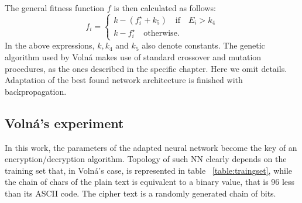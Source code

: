 \documentclass[%
    corpo=11pt,
    twoside,
    stile=classica,
    oldstyle,
    autoretitolo,
    tipotesi=magistrale,
    greek,
    evenboxes,
    english
]{toptesi}
\begin{document}
The general fitness function  $f$ is then calculated as follows:
$$
f_i = \begin{cases}
k - (f_i^{\star} + k_5) \quad \text{if} \quad E_i > k_4 \\
k - f_i^{\star} \quad \text{otherwise.}
\end{cases} 
$$ 
In the above expressions, $k, k_4$ and $k_5$ also denote constants.
The genetic algorithm used by Volná makes use of standard crossover and mutation procedures, as the ones described in the specific chapter. Here we omit details. \\
Adaptation of the best found network architecture is finished with backpropagation.

\subsection{Volná's experiment}
In this work, the parameters of the adapted neural network become the key of an encryption/decryption algorithm. Topology of such NN clearly depends on the training set that, in Volná's case, is represented in table ~\ref{table:traingset}, while the chain of chars of the plain text is equivalent to a binary value, that is 96 less than its ASCII code. The cipher text is a randomly generated chain of bits.
\end{document}
